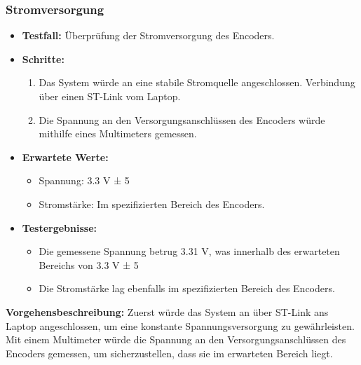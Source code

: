 \subsubsection{Stromversorgung}
\begin{itemize}
\item \textbf{Testfall:} Überprüfung der Stromversorgung des Encoders.
\item \textbf{Schritte:}
\begin{enumerate}
\item Das System würde an eine stabile Stromquelle angeschlossen. Verbindung über einen ST-Link vom Laptop.
\item Die Spannung an den Versorgungsanschlüssen des Encoders würde mithilfe eines Multimeters gemessen.
\end{enumerate}
\item \textbf{Erwartete Werte:}
\begin{itemize}
\item Spannung: 3.3 V ± 5%
\item Stromstärke: Im spezifizierten Bereich des Encoders.
\end{itemize}
\item \textbf{Testergebnisse:}
\begin{itemize}
\item Die gemessene Spannung betrug 3.31 V, was innerhalb des erwarteten Bereichs von 3.3 V ± 5%
\item Die Stromstärke lag ebenfalls im spezifizierten Bereich des Encoders.
\end{itemize}
\end{itemize}

\textbf{Vorgehensbeschreibung:}
Zuerst würde  das System an über ST-Link ans Laptop angeschlossen, um eine konstante Spannungsversorgung zu gewährleisten. Mit einem Multimeter würde die Spannung an den Versorgungsanschlüssen des Encoders gemessen, um sicherzustellen, dass sie im erwarteten Bereich liegt.

